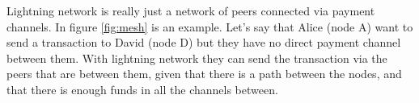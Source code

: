 Lightning network is really just a network of peers connected via payment channels. In figure \ref{fig:mesh} is an example. Let's say that Alice (node A) want to send a transaction to David (node D) but they have no direct payment channel between them. With lightning network they can send the transaction via the peers that are between them, given that there is a path between the nodes, and that there is enough funds in all the channels between. 